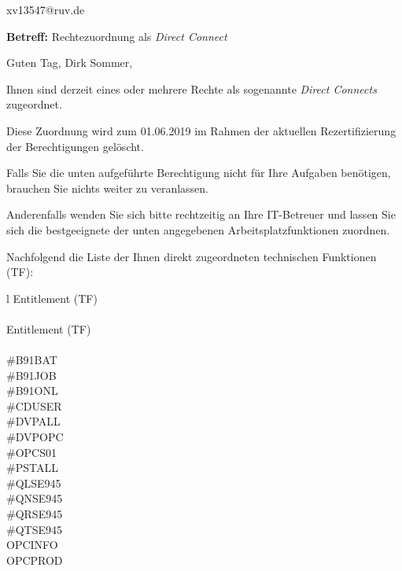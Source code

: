 \documentclass[a4paper,landscape,12pt]{letter}
\begin{document}
\begin{letter}{xv13547@ruv.de\hfill \break}
\begin{normalsize}
	\opening{\textbf{Betreff:} Rechtezuordnung als \emph{Direct Connect}}
	\begin{normalsize} \hfill
	\end{normalsize}

	\begin{normalsize}
		Guten Tag, 
	Dirk Sommer, \hfill \break
	\end{normalsize}
	\end{normalsize}
	
\begin{normalsize}
	Ihnen sind derzeit eines oder mehrere Rechte als sogenannte \emph{Direct Connects} zugeordnet.
	
	Diese Zuordnung wird zum 01.06.2019 im Rahmen der aktuellen Rezertifizierung der Berechtigungen gelöscht.
	
	Falls Sie die unten aufgeführte Berechtigung nicht für Ihre Aufgaben benötigen, 
	brauchen Sie nichts weiter zu veranlassen.
	
	Anderenfalls wenden Sie sich bitte rechtzeitig an Ihre IT-Betreuer 
	und lassen Sie sich die bestgeeignete der unten angegebenen Arbeitsplatzfunktionen zuordnen.
	\end{normalsize}
	
\begin{normalsize}
	Nachfolgend die Liste der Ihnen direkt zugeordneten technischen Funktionen (TF):

	\begin{longtable}{l}
		Entitlement (TF) \\ \hline
		\endfirsthead
		\\\hline
		Entitlement (TF) \\ \hline
		\endhead %
		\multicolumn{1}{r@{}}{Fortsetzung \ldots}\\
		\endfoot
		\hline
		\endlastfoot
	\#B91BAT\\\#B91JOB\\\#B91ONL\\\#CDUSER\\\#DVPALL\\\#DVPOPC\\\#OPCS01\\\#PSTALL\\\#QLSE945\\\#QNSE945\\\#QRSE945\\\#QTSE945\\OPCINFO\\OPCPROD\\
	\end{longtable}
	\end{normalsize}
	

\end{letter}
\end{document}
